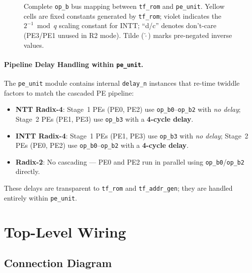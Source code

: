 \documentclass[11pt,a4paper]{article}
\newcommand{\sv}[1]{\texttt{#1}}
\newcommand{\port}[1]{\texttt{#1}}
\begin{document}
\begin{figure}[H]
\caption{Complete \port{op\_b} bus mapping between \sv{tf\_rom} and \sv{pe\_unit}.
  Yellow cells are fixed constants generated by \sv{tf\_rom};
  violet indicates the $2^{-1} \bmod q$ scaling constant for INTT;
  ``d/c'' denotes don't-care (PE3/PE1 unused in R2 mode).
  Tilde ($\widetilde{\cdot}$) marks pre-negated inverse values.}
\label{fig:opb-mapping}
\end{figure}

\paragraph{Pipeline Delay Handling within \sv{pe\_unit}.}
The \sv{pe\_unit} module contains internal \sv{delay\_n} instances that re-time
twiddle factors to match the cascaded PE pipeline:
\begin{itemize}
  \item \textbf{NTT Radix-4}: Stage~1 PEs (PE0, PE2) use \port{op\_b0}--\port{op\_b2}
    with \emph{no delay}; Stage~2 PEs (PE1, PE3) use \port{op\_b3} with a \textbf{4-cycle delay}.
  \item \textbf{INTT Radix-4}: Stage~1 PEs (PE1, PE3) use \port{op\_b3}
    with \emph{no delay}; Stage~2 PEs (PE0, PE2) use \port{op\_b0}--\port{op\_b2}
    with a \textbf{4-cycle delay}.
  \item \textbf{Radix-2}: No cascading --- PE0 and PE2 run in parallel using
    \port{op\_b0}/\port{op\_b2} directly.
\end{itemize}

These delays are transparent to \sv{tf\_rom} and \sv{tf\_addr\_gen}; they are
handled entirely within \sv{pe\_unit}.

\section{Top-Level Wiring}
\label{sec:wiring}

\subsection{Connection Diagram}
\end{document}
